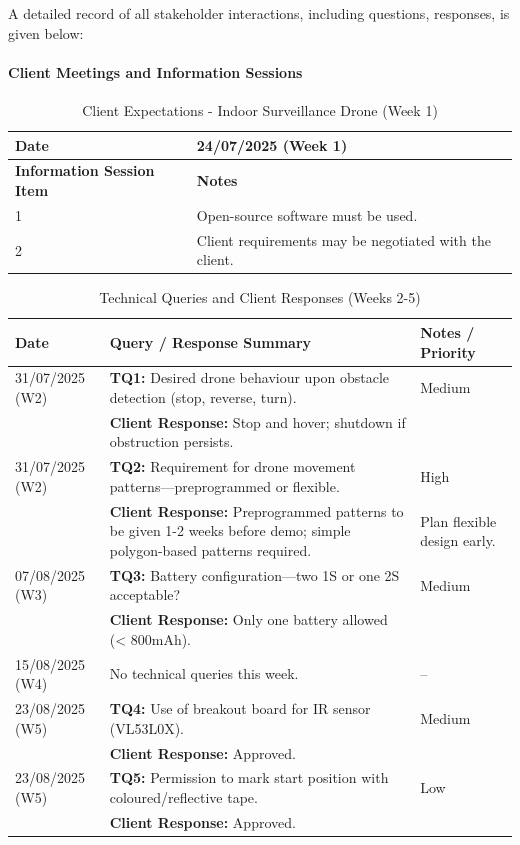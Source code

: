 A detailed record of all stakeholder interactions, including questions, responses, is given below:

\paragraph{\textbf{Client Meetings and Information Sessions}} \leavevmode

\begin{table}[H]
\centering
\caption{Client Expectations - Indoor Surveillance Drone (Week 1)}
\begin{tabular}{|l|p{11cm}|}
\hline
\textbf{Date} & 24/07/2025 (Week 1) \\ \hline
\textbf{Information Session Item} & \textbf{Notes} \\ \hline
1 & Open-source software must be used. \\ \hline
2 & Client requirements may be negotiated with the client. \\ \hline
\end{tabular}
\end{table}

\begin{table}[H]
\centering
\caption{Technical Queries and Client Responses (Weeks 2-5)}
\begin{tabular}{|p{3cm}|p{8cm}|p{3.5cm}|}
\hline
\textbf{Date} & \textbf{Query / Response Summary} & \textbf{Notes / Priority} \\ \hline
31/07/2025 (W2) & \textbf{TQ1:} Desired drone behaviour upon obstacle detection (stop, reverse, turn). & Medium \\ \hline
 & \textbf{Client Response:} Stop and hover; shutdown if obstruction persists. & \\ \hline
31/07/2025 (W2) & \textbf{TQ2:} Requirement for drone movement patterns—preprogrammed or flexible. & High \\ \hline
 & \textbf{Client Response:} Preprogrammed patterns to be given 1-2 weeks before demo; simple polygon-based patterns required. & Plan flexible design early. \\ \hline
07/08/2025 (W3) & \textbf{TQ3:} Battery configuration—two 1S or one 2S acceptable? & Medium \\ \hline
 & \textbf{Client Response:} Only one battery allowed (< 800mAh). & \\ \hline
15/08/2025 (W4) & No technical queries this week. & -- \\ \hline
23/08/2025 (W5) & \textbf{TQ4:} Use of breakout board for IR sensor (VL53L0X). & Medium \\ \hline
 & \textbf{Client Response:} Approved. &  \\ \hline
23/08/2025 (W5) & \textbf{TQ5:} Permission to mark start position with coloured/reflective tape. & Low \\ \hline
 & \textbf{Client Response:} Approved. & \\ \hline
\end{tabular}
\end{table}


